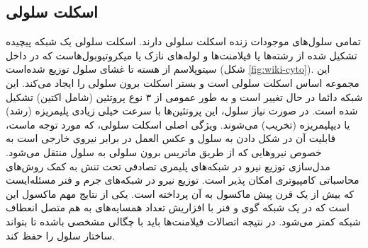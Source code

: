 \subsection{اسکلت سلولی}\label{lab:skeleton}
تمامی سلول‌های موجودات زنده اسکلت سلولی دارند. اسکلت سلولی یک شبکه پیچیده تشکیل شده از رشته‌ها یا فیلامنت‌ها و لوله‌های نازک یا میکروتیوبول‌هاست که در داخل سیتوپلاسم از هسته تا غشای سلول توزیع شده‌است (شکل \ref{fig:wiki-cyto})\cite{hardin2014becker,PhysRevLett.120.068001}. این مجموعه اساس اسکلت سلولی است و بستر اسکلت برون سلولی را ایجاد می‌کند. این شبکه دائما در حال تغییر است و به طور عمومی از ۳ نوع پروتئین (شامل اکتین) تشکیل شده است. در صورت نیاز سلول، این پروتئین‌ها با سرعت خیلی زیادی پلیمریزه (رشد) یا دیپلیمریزه (تخریب) می‌شوند. ویژگی اصلی اسکلت سلولی، که مورد توجه ماست، قابلیت آن در شکل دادن به سلول و عکس العمل در برابر نیرو‌ی خارجی است به خصوص نیروهایی که از طریق ماتریس برون سلولی به سلول منتقل می‌شود\cite{PhysRevLett.120.068001}. مدل‌سازی توزیع نیرو در شبکه‌های پلیمری تصادفی تحت تنش به کمک روش‌های محاسباتی کامپیوتری امکان پذیر است\cite{Heussinger2007}. توزیع نیرو در شبکه‌های جرم و فنر مسئله‌ایست که بیش از یک قرن پیش  ماکسول به آن پرداخته است. یکی از نتایج مهم ماکسول این است که در یک شبکه گوی و فنر با افزاریش تعداد همسایه‌های به هم متصل انعطاف شبکه کمتر می‌شود\cite{doi:10.1080/14786446408643668}. در نتیجه اتصالات فیلامنت‌ها باید با چگالی مشخصی باشده تا بتواند ساختار سلول را حفظ کند.




